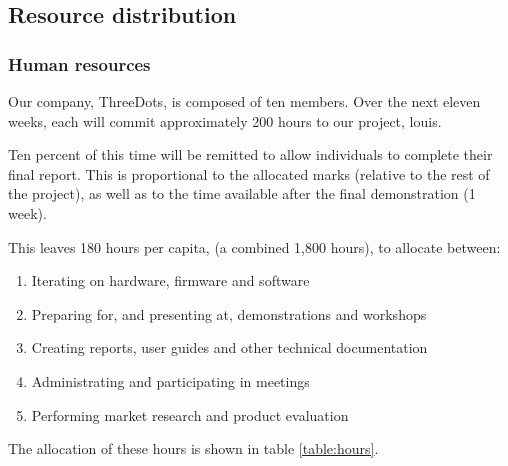 \documentclass{article}
\begin{document}
\subsection{Resource distribution}

\subsubsection{Human resources}

Our company, ThreeDots, is composed of ten members. Over the next eleven weeks, each will commit approximately 200 hours to our project, louis.

Ten percent of this time will be remitted to allow individuals to complete their final report. This is proportional to the allocated marks (relative to the rest of the project), as well as to the time available after the final demonstration (1 week).

This leaves 180 hours per capita, (a combined 1,800 hours), to allocate between:
\begin{enumerate}
  \item Iterating on hardware, firmware and software
  \item Preparing for, and presenting at, demonstrations and workshops
  \item Creating reports, user guides and other technical documentation
  \item Administrating and participating in meetings
  \item Performing market research and product evaluation
\end{enumerate}

The allocation of these hours is shown in table \ref{table:hours}.
\end{document}
